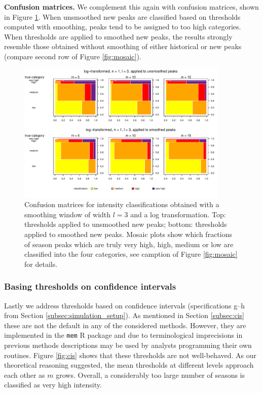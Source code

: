 \documentclass{article}
\begin{document}
\textbf{Confusion matrices.} We complement this again with confusion matrices, shown in Figure \ref{fig:mosaic_smoothing}. When unsmoothed new peaks are classified based on thresholds computed with smoothing, peaks tend to be assigned to too high categories. When thresholds are applied to smoothed new peaks, the results strongly resemble those obtained without smoothing of either historical or new peaks (compare second row of Figure \ref{fig:mosaic}).


\begin{figure}[h!]
\begin{center}
\includegraphics[width=0.9\textwidth]{figure/mosaic_log_smoothed_fr.pdf}
\caption{Confusion matrices for intensity classifications obtained with a smoothing window of width $l = 3$ and a log transformation. Top: thresholds applied to unsmoothed new peaks; bottom: thresholds applied to smoothed new peaks. Mosaic plots show which fractions of season peaks which are truly very high, high, medium or low are classified into the four categories, see camption of Figure \ref{fig:mosaic} for details.}
\end{center}
\label{fig:mosaic_smoothing}
\end{figure}


\subsubsection{Basing thresholds on confidence intervals}

Lastly we address thresholds based on confidence intervals (specifications g--h from Section \ref{subsec:simulation_setup}). As mentioned in Section \ref{subsec:cis} these are not the default in any of the  considered methods. However, they are implemented in the \texttt{mem} R package and due to terminological imprecisions in previous methods descriptions may be used by analysts programming their own routines. Figure \ref{fig:cis} shows that these thresholds are not well-behaved. As our theoretical reasoning suggested, the mean thresholds at different levels approach each other as $m$ grows. Overall, a considerably too large number of seasons is classified as very high intensity.
\end{document}
